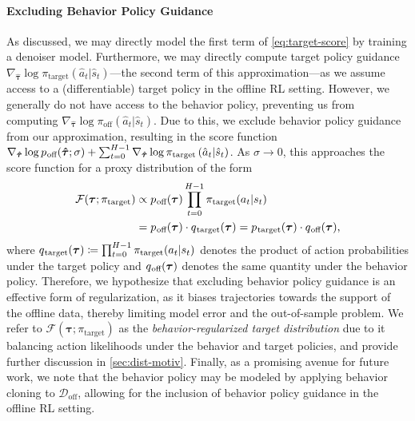 \documentclass[10pt]{article} %
\theoremstyle{plain}
\theoremstyle{definition}
\theoremstyle{remark}
\newcommand{\ptarg}{p_{\mkern1mu\text{target}}}
\newcommand{\qtarg}{q_{\mkern1mu\text{target}}}
\newcommand{\poff}{p_{\mkern1mu\text{off}}}
\newcommand{\qoff}{q_{\mkern1mu\text{off}}}
\newcommand{\doff}{\mathcal{D}_{\text{off}}}
\begin{document}
\paragraph{Excluding Behavior Policy Guidance}
As discussed, we may directly model the first term of \autoref{eq:target-score} by training a denoiser model. Furthermore, we may directly compute target policy guidance $\nabla_{\bm{\hat{\tau}}}\log \pi_{\text{target}}\left(\hat{a}_t|\hat{s}_t\right)$---the second term of this approximation---as we assume access to a (differentiable) target policy in the offline RL setting. However, we generally do not have access to the behavior policy, preventing us from computing $\nabla_{\bm{\hat{\tau}}}\log \pi_{\text{off}}\left(\hat{a}_t|\hat{s}_t\right)$. Due to this, we exclude behavior policy guidance from our approximation, resulting in the score function $\nabla_{\bm{\hat{\tau}}}\log \poff(\bm{\hat{\tau}};\sigma) + \sum_{t=0}^{H-1} \nabla_{\bm{\hat{\tau}}}\log \pi_{\text{target}}\left(\hat{a}_t|\hat{s}_t\right)$.
As $\sigma \to 0$, this approaches the score function for a proxy distribution of the form
\begin{align}
    \notag \mathcal{F}(\bm{\tau} ; \pi_{\text{target}}) 
    &\propto \poff(\bm{\tau}) \prod_{t=0}^{H-1} \pi_{\text{target}}(a_t|s_t) \\
    &= \poff(\bm{\tau}) \cdot \qtarg(\bm{\tau}) = \ptarg(\bm{\tau}) \cdot \qoff(\bm{\tau}) \text{,} \label{eq:pgd}
\end{align}
where $\qtarg(\bm{\tau}) \coloneqq \prod_{t=0}^{H-1} \pi_{\text{target}}(a_t|s_t)$ denotes the product of action probabilities under the target policy and $\qoff(\bm{\tau})$ denotes the same quantity under the behavior policy.
Therefore, we hypothesize that excluding behavior policy guidance is an effective form of regularization, as it biases trajectories towards the support of the offline data, thereby limiting model error and the out-of-sample problem.
We refer to $\mathcal{F}(\bm{\tau} ; \pi_{\text{target}})$ as the \textit{behavior-regularized target distribution} due to it balancing action likelihoods under the behavior and target policies, and provide further discussion in \autoref{sec:dist-motiv}.
Finally, as a promising avenue for future work, we note that the behavior policy may be modeled by applying behavior cloning to $\doff$, allowing for the inclusion of behavior policy guidance in the offline RL setting.
\end{document}
